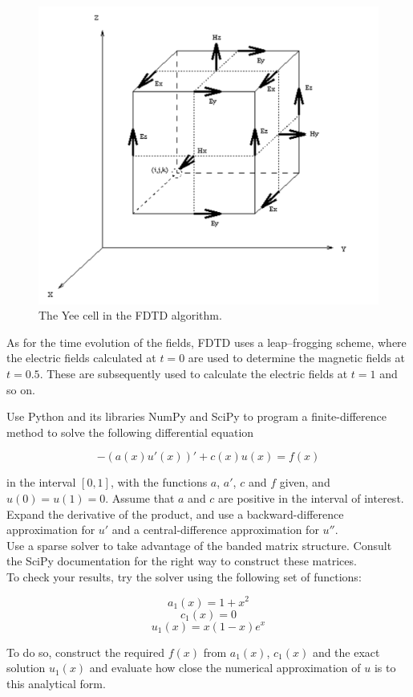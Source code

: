 \begin{figure}
\centering
\includegraphics[scale=0.5]{numeric/figures/yeecell}
\caption{The Yee cell in the FDTD algorithm.}
\label{fig-yee}
\end{figure}

As for the time evolution of the fields, FDTD uses a leap--frogging scheme, where the electric fields calculated at $t=0$ are used to determine the magnetic fields at $t=0.5$. These are subsequently used to calculate the electric fields at $t=1$ and so on.

\begin{sidebar}
\begin{ex}
Use Python and its libraries NumPy and SciPy to program a finite-difference method to solve the following differential equation

$$ -\left(a(x) u'(x) \right)' + c(x)u(x) = f(x)$$

in the interval $[0,1]$, with the functions $a$, $a'$, $c$ and $f$ given, and $u(0) = u(1) = 0$. Assume that $a$ and $c$ are positive in the interval of interest.\\

Expand the derivative of the product, and use a backward-difference approximation for $u'$ and a central-difference approximation for $u''$. \\

Use a sparse solver to take advantage of the banded matrix structure. Consult the SciPy documentation for the right way to construct these matrices. \\

To check your results, try the solver using the following set of functions:

$$a_1(x) = 1 + x^2$$
$$c_1(x) = 0$$
$$u_1(x) = x(1-x) e^x $$

To do so, construct the required $f(x)$ from $a_1(x)$, $c_1(x)$ and the exact solution $u_1(x)$ and evaluate how close the numerical approximation of $u$ is to this analytical form.

\end{ex}
\end{sidebar}

